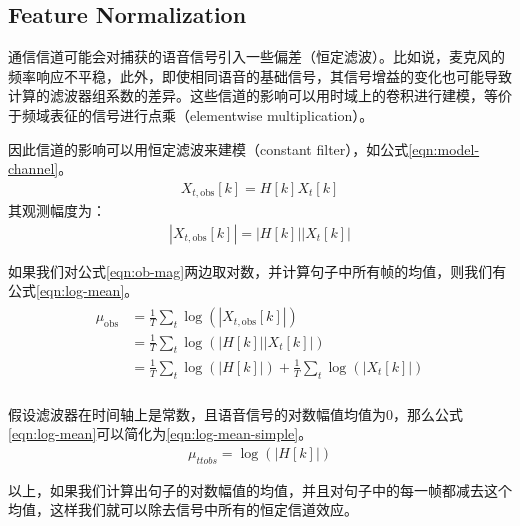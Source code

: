 \subsection{Feature Normalization} %
\label{sub:feature_normalization}
通信信道可能会对捕获的语音信号引入一些偏差（恒定滤波）。比如说，麦克风的频率响应不平稳，此外，即使相同语音的基础信号，其信号增益的变化也可能导致计算的滤波器组系数的差异。这些信道的影响可以用时域上的卷积进行建模，等价于频域表征的信号进行点乘（elementwise multiplication）。

因此信道的影响可以用恒定滤波来建模（constant filter），如公式\ref{eqn:model-channel}。
\begin{align}
\label{eqn:model-channel}
X_{t, \mathrm{obs}}[k]=H[k] X_{t}[k]
\end{align}
其观测幅度为：
\begin{align}
\label{eqn:ob-mag}
\left|X_{t, \mathrm{obs}}[k]\right|=|H[k]|\left|X_{t}[k]\right|
\end{align}

如果我们对公式\ref{eqn:ob-mag}两边取对数，并计算句子中所有帧的均值，则我们有公式\ref{eqn:log-mean}。
\begin{align}
\begin{split}
\label{eqn:log-mean}
\mu_{\mathrm{obs}}
    &=\frac{1}{T} \sum_{t} \log \left(\left|X_{t, \mathrm{obs}}[k]\right|\right) \\
    &=\frac{1}{T} \sum_{t} \log \left(|H[k]|\left|X_{t}[k]\right|\right) \\
    &=\frac{1}{T} \sum_{t} \log (|H[k]|)+\frac{1}{T} \sum_{t} \log \left(\left|X_{t}[k]\right|\right)\\
\end{split}
\end{align}

假设滤波器在时间轴上是常数，且语音信号的对数幅值均值为0，那么公式\ref{eqn:log-mean}可以简化为\ref{eqn:log-mean-simple}。
\begin{align}
\label{eqn:log-mean-simple}
  \mu_{t t o b s}=\log (|H[k]|)
\end{align}

以上，如果我们计算出句子的对数幅值的均值，并且对句子中的每一帧都减去这个均值，这样我们就可以除去信号中所有的恒定信道效应。

